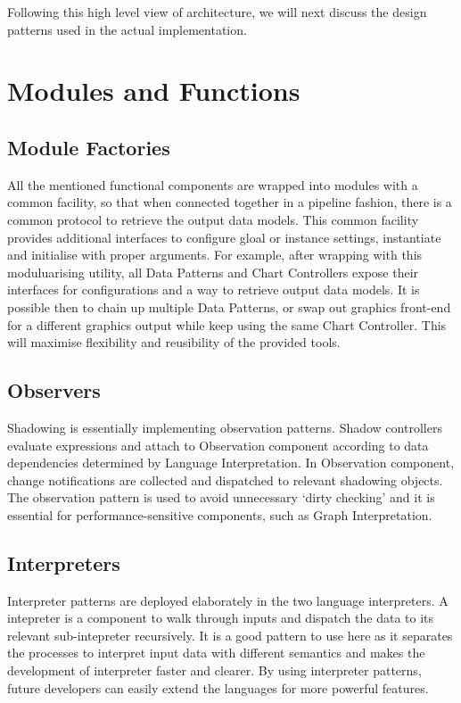 \documentclass[11pt, a4paper]{report}
\begin{document}
Following this high level view of architecture, we will next discuss the design patterns used in the actual implementation.
\section{Modules and Functions}
\subsection{Module Factories}
All the mentioned functional components are wrapped into modules with a common facility, so that when connected together in a pipeline fashion, there is a common protocol to retrieve the output data models. This common facility provides additional interfaces to configure gloal or instance settings, instantiate and initialise with proper arguments. For example, after wrapping with this moduluarising utility, all Data Patterns and Chart Controllers expose their interfaces for configurations and a way to retrieve output data models. It is possible then to chain up multiple Data Patterns, or swap out graphics front-end for a different graphics output while keep using the same Chart Controller. This will maximise flexibility and reusibility of the provided tools.
\subsection{Observers}
Shadowing is essentially implementing observation patterns. Shadow controllers evaluate expressions and attach to Observation component according to data dependencies determined by Language Interpretation. In Observation component, change notifications are collected and dispatched to relevant shadowing objects. The observation pattern is used to avoid unnecessary `dirty checking' and it is essential for performance-sensitive components, such as Graph Interpretation.
\subsection{Interpreters}
Interpreter patterns are deployed elaborately in the two language interpreters. A intepreter is a component to walk through inputs and dispatch the data to its relevant sub-intepreter recursively. It is a good pattern to use here as it separates the processes to interpret input data with different semantics and makes the development of interpreter faster and clearer. By using interpreter patterns, future developers can easily extend the languages for more powerful features.
\end{document}
